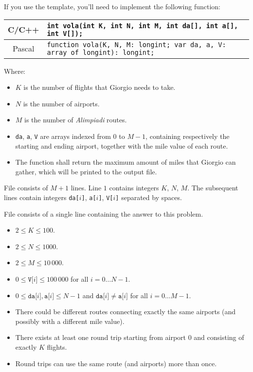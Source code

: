 If you use the template, you'll need to implement the following function:
\begin{center}\begin{tabularx}{\textwidth}{|c|X|}
\hline
C/C++  & \verb|int vola(int K, int N, int M, int da[], int a[], int V[]);|\\
\hline
Pascal & \verb|function vola(K, N, M: longint; var da, a, V: array of longint): longint;|\\
\hline
\end{tabularx}\end{center}
Where:
\begin{itemize}[nolistsep]
  \item $K$ is the number of flights that Giorgio needs to take.
  \item $N$ is the number of airports.
  \item $M$ is the number of \emph{Alimpiadi} routes.
  \item \texttt{da}, \texttt{a}, \texttt{V} are arrays indexed from $0$ to $M-1$, containing respectively the starting and ending airport, together with the mile value of each route.
  \item The function shall return the maximum amount of miles that Giorgio can gather, which will be printed to the output file.
\end{itemize}

\InputFile
File  consists of $M+1$ lines. Line $1$ contains integers $K$, $N$, $M$. The subsequent lines contain integers \texttt{da[$i$]}, \texttt{a[$i$]}, \texttt{V[$i$]} separated by spaces.

\OutputFile
File \outputfile{} consists of a single line containing the answer to this problem.

\pagebreak
\Constraints
\begin{itemize}[nolistsep, itemsep=2mm]
	\item $2 \le K \le 100$.
	\item $2 \le N \le 1000$.
	\item $2 \le M \le 10\,000$.
	\item $0 \le \texttt{V[$i$]} \le 100\,000$ for all $i=0\ldots N-1$.
	\item $0 \le \texttt{da[$i$]}, \texttt{a[$i$]} \le N-1$ and $\texttt{da[$i$]} \neq \texttt{a[$i$]}$ for all $i = 0 \ldots M-1$.
	\item There could be different routes connecting exactly the same airports (and possibly with a different mile value).
	\item There exists at least one round trip starting from airport $0$ and consisting of exactly $K$ flights.
	\item Round trips can use the same route (and airports) more than once.
\end{itemize}

